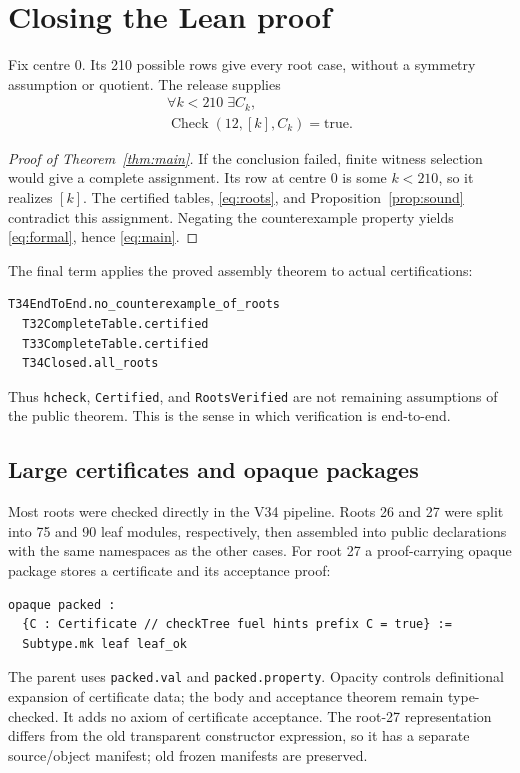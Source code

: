 \documentclass[11pt,a4paper]{article}
\theoremstyle{definition}
\newcommand{\CertCheck}{\operatorname{Check}}
\newcommand{\code}[1]{\texttt{#1}}
\begin{document}
\section{Closing the Lean proof}\label{sec:lean}
Fix centre 0. Its 210 possible rows give every root case, without a symmetry assumption or quotient. The release supplies
\begin{equation}\label{eq:roots}
 \begin{gathered}\forall k<210\;\exists C_k,\qquad\\
 \CertCheck(12,[k],C_k)=\mathrm{true}.\end{gathered}
\end{equation}
\begin{proof}[Proof of Theorem~\ref{thm:main}]
If the conclusion failed, finite witness selection would give a complete assignment. Its row at centre 0 is some $k<210$, so it realizes $[k]$. The certified tables, \eqref{eq:roots}, and Proposition~\ref{prop:sound} contradict this assignment. Negating the counterexample property yields \eqref{eq:formal}, hence \eqref{eq:main}.
\end{proof}
The final term applies the proved assembly theorem to actual certifications:
\begin{lstlisting}
T34EndToEnd.no_counterexample_of_roots
  T32CompleteTable.certified
  T33CompleteTable.certified
  T34Closed.all_roots
\end{lstlisting}
Thus \code{hcheck}, \code{Certified}, and \code{RootsVerified} are not remaining assumptions of the public theorem. This is the sense in which verification is end-to-end.

\subsection{Large certificates and opaque packages}
Most roots were checked directly in the V34 pipeline. Roots 26 and 27 were split into 75 and 90 leaf modules, respectively, then assembled into public declarations with the same namespaces as the other cases. For root 27 a proof-carrying opaque package stores a certificate and its acceptance proof:
\begin{lstlisting}
opaque packed :
  {C : Certificate // checkTree fuel hints prefix C = true} :=
  Subtype.mk leaf leaf_ok
\end{lstlisting}
The parent uses \code{packed.val} and \code{packed.property}. Opacity controls definitional expansion of certificate data; the body and acceptance theorem remain type-checked. It adds no axiom of certificate acceptance. The root-27 representation differs from the old transparent constructor expression, so it has a separate source/object manifest; old frozen manifests are preserved.
\end{document}
